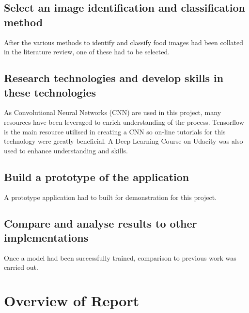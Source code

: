 \subsection*{Select an image identification and classification method}
After the various methods to identify and classify food images had been collated in the literature review, one of these had to be selected.

\subsection*{Research technologies and develop skills in these technologies}
As Convolutional Neural Networks (CNN) are used in this project, many resources have been leveraged to enrich understanding of the process.
Tensorflow is the main resource utilised  in creating a CNN so on-line tutorials for this technology were greatly beneficial.
A Deep Learning Course on Udacity was also used to enhance understanding and skills.

\subsection*{Build a prototype of the application}
A prototype application had to built for demonstration for this project.

\subsection*{Compare and analyse results to other implementations}
Once a model had been successfully trained, comparison to previous work was carried out.

\section{Overview of Report}


